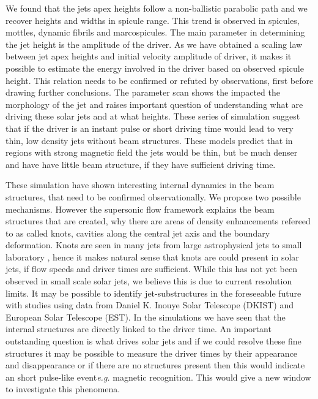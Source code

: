 \documentclass[12pt]{ociamthesis}
\begin{document}
We found that the jets apex heights follow a non-ballistic parabolic path and we recover heights and widths in spicule range. This trend is observed in spicules, mottles, dynamic fibrils and marcospicules. The main parameter in determining the jet height is the amplitude of the driver. As we have obtained a scaling law between jet apex heights and initial velocity amplitude of driver, it makes it possible to estimate the energy involved in the driver based on observed spicule height. This relation needs to be confirmed or refuted by observations, first before drawing further conclusions. The parameter scan shows the impacted the morphology of the jet and raises important question of understanding what are driving these solar jets and at what heights. These series of simulation suggest that if the driver is an instant pulse or short driving time would lead to very thin, low density jets without beam structures. These models predict that in regions with strong magnetic field the jets would be thin, but be much denser and have have little beam structure, if they have sufficient driving time.

These simulation have shown interesting internal dynamics in the beam structures, that need to be confirmed observationally. We propose two possible mechanisms. However the supersonic flow framework explains the beam structures that are created, why there are areas of density enhancements refereed to as called knots, cavities along the central jet axis and the boundary deformation. Knots are seen in many jets from large astrophysical jets \citep{van_Putten_1996ApJ467L57V, DeGouveiaDalPino2005, Hada2013ApJ77570H, Cohen2014ApJ787151C, Hervet2017AnA606A103H} to small laboratory \citep{Menon2010, Edgington-Mitchell2014, Ono2014}, hence it makes natural sense that knots are could present in solar jets, if flow speeds and driver times are sufficient. While this has not yet been observed in small scale solar jets, we believe this is due to current resolution limits. It may be possible to identify jet-substructures in the foreseeable future with studies using data from Daniel K. Inouye Solar Telescope (DKIST) and European Solar Telescope (EST). In the simulations we have seen that the internal structures are directly linked to the driver time. An important outstanding question is what drives solar jets and if we could resolve these fine structures it may be possible to measure the driver times by their appearance and disappearance or if there are no structures present then this would indicate an short pulse-like event\textit{e.g.} magnetic recognition. This would give a new window to investigate this phenomena.
\end{document}
